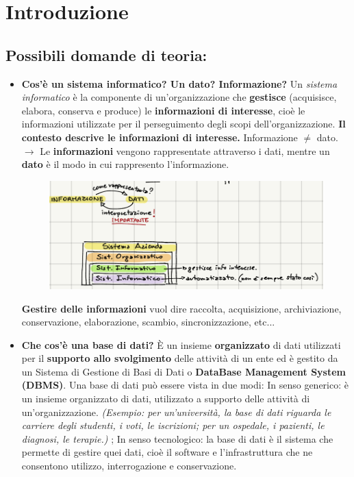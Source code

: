 \documentclass{article}
\begin{document}
\section{Introduzione}
\subsection{Possibili domande di teoria:}

\begin{itemize}
    \item \textbf{Cos'è un sistema informatico? Un dato? Informazione?} Un \textit{sistema informatico} è la componente di un'organizzazione che \textbf{gestisce} (acquisisce, elabora, conserva e produce) le \textbf{informazioni di interesse}, cioè le informazioni utilizzate per il perseguimento degli scopi dell'organizzazione. \textbf{Il contesto descrive le informazioni di interesse.} Informazione $\neq$ dato. $\to$ Le \textbf{informazioni} vengono rappresentate attraverso i dati, mentre un \textbf{dato} è il modo in cui rappresento l'informazione.
    \begin{figure}[h!]
        \centering
        \includegraphics[width=0.7\linewidth]{schema1.png}
    \end{figure}
    \textbf{Gestire delle informazioni} vuol dire raccolta, acquisizione, archiviazione, conservazione, elaborazione, scambio, sincronizzazione, etc...
    \item \textbf{Che cos'è una base di dati?} È un insieme \textbf{organizzato} di dati utilizzati per il \textbf{supporto allo svolgimento} delle attività di un ente ed è gestito da un Sistema di Gestione di Basi di Dati o \textbf{DataBase Management System (DBMS)}. Una base di dati può essere vista in due modi: In senso generico: è un insieme organizzato di dati, utilizzato a supporto delle attività di un'organizzazione. \textit{(Esempio: per un'università, la base di dati riguarda le carriere degli studenti, i voti, le iscrizioni; per un ospedale, i pazienti, le diagnosi, le terapie.) }; In senso tecnologico: la base di dati è il sistema che permette di gestire quei dati, cioè il software e l'infrastruttura che ne consentono utilizzo, interrogazione e conservazione.

\end{itemize}
\end{document}
